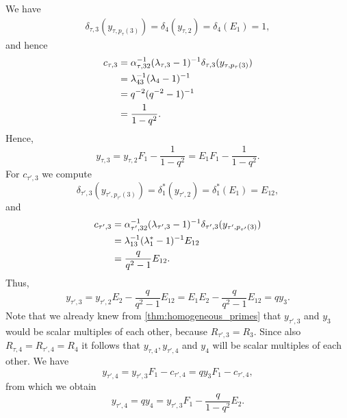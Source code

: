 \begin{example}
	We have
	\begin{align*}
		\delta_{\tau, 3}(y_{\tau, p_\tau(3)})
		= \delta_4(y_{\tau, 2})
		= \delta_4(E_1)
		= 1,
	\end{align*}
	and hence
	\begin{align*}
		c_{\tau, 3}
		 & = \alpha_{\tau, 32}^{-1} (\lambda_{\tau, 3} - 1)^{-1} \delta_{\tau, 3}(y_{\tau, p_\tau(3)}) \\
		 & = \lambda_{43}^{-1} (\lambda_{4} - 1)^{-1}                                                  \\
		 & = q^{-2} (q^{-2} - 1)^{-1}                                                                 \\
		 & = \frac{1}{1-q^2}.
	\end{align*}
	Hence,
	\begin{equation*}
		y_{\tau, 3} = y_{\tau, 2}F_1 - \frac{1}{1-q^2} = E_1 F_1 - \frac{1}{1-q^2}.
	\end{equation*}
	For $c_{\tau', 3}$ we compute
	\begin{equation*}
		\delta_{\tau', 3}(y_{\tau', p_{\tau'}(3)}) = \delta_1^*(y_{\tau', 2}) = \delta_1^*(E_1) = E_{12},
	\end{equation*}
	and
	\begin{align*}
		c_{\tau', 3}
		 & = \alpha_{\tau', 32}^{-1} (\lambda_{\tau', 3} - 1)^{-1} \delta_{\tau', 3}(y_{\tau', p_{\tau'}(3)}) \\
		 & = \lambda_{13}^{-1} (\lambda_{1}^* - 1)^{-1}  E_{12}                                               \\
		 & =  \frac{q}{q^2 - 1} E_{12}.
	\end{align*}
	Thus,
	\begin{equation*}
		y_{\tau', 3} = y_{\tau', 2}E_2 - \frac{q}{q^2 -1} E_{12} = E_1 E_2 - \frac{q}{q^2-1}E_{12} = q y_3.
	\end{equation*}
	Note that we already knew from \cref{thm:homogeneous_primes} that $y_{\tau', 3}$ and
	$y_3$ would be scalar multiples of each other, because $R_{\tau', 3} = R_3$. Since also
	$R_{\tau, 4} = R_{\tau', 4} = R_4$ it follows that $y_{\tau, 4}, y_{\tau', 4}$ and
	$y_4$ will be scalar multiples of each other. We have
	\begin{equation*}
		y_{\tau', 4} = y_{\tau',3} F_1 - c_{\tau',4} = q y_3 F_1 - c_{\tau',4},
	\end{equation*}
	from which we obtain
	\begin{equation*}
		y_{\tau', 4} = qy_4 = y_{\tau', 3} F_1 - \frac{q}{1-q^2}E_2.
	\end{equation*}

\end{example}

